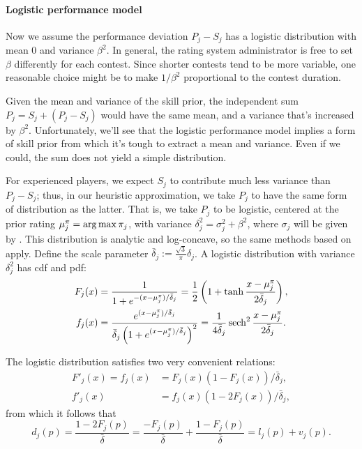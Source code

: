 \paragraph{Logistic performance model}
Now we assume the performance deviation $P_j-S_j$ has a logistic distribution with mean 0 and variance $\beta^2$. In general, the rating system administrator is free to set $\beta$ differently for each contest. Since shorter contests tend to be more variable, one reasonable choice might be to make $1/\beta^2$ proportional to the contest duration.

Given the mean and variance of the skill prior, the independent sum $P_j = S_j + (P_j-S_j)$ would have the same mean, and a variance that's increased by $\beta^2$. Unfortunately, we'll see that the logistic performance model implies a form of skill prior from which it's tough to extract a mean and variance. Even if we could, the sum does not yield a simple distribution.

For experienced players, we expect $S_j$ to contribute much less variance than $P_j-S_j$; thus, in our heuristic approximation, we take $P_j$ to have the same form of distribution as the latter. That is, we take $P_j$ to be logistic, centered at the prior rating $\mu^\pi_j = \operatorname*{arg\,max} \pi_j$, with variance $\delta_j^2 = \sigma_j^2 + \beta^2$, where $\sigma_j$ will be given by . This distribution is analytic and log-concave, so the same methods based on  apply. 
Define the scale parameter $\bar\delta_j := \frac{\sqrt{3}}{\pi} \delta_j$. A logistic distribution with variance $\delta_j^2$ has cdf and pdf:
\begin{align*}
F_j(x) &= \frac { 1 } { 1 + e^{-(x-\mu^\pi_j)/\bar\delta_j} }
= \frac 12 \left(1 + \tanh\frac{x-\mu^\pi_j}{2\bar\delta_j} \right),
\\f_j(x) &= \frac { e^{(x-\mu^\pi_j)/\bar\delta_j} } { \bar\delta_j\left( 1 + e^{(x-\mu^\pi_j)/\bar\delta_j} \right)^2}
= \frac { 1 } { 4\bar\delta_j} \operatorname{sech}^2\frac{x-\mu^\pi_j}{2\bar\delta_j}.
\end{align*}

The logistic distribution satisfies two very convenient relations:
\begin{align*}
F'_j(x) = f_j(x) &= F_j(x) (1 - F_j(x)) / \bar\delta_j,
\\f'_j(x) &= f_j(x) (1 - 2F_j(x)) / \bar\delta_j,
\end{align*}
from which it follows that
\[d_j(p)
= \frac{1 - 2F_j(p)}{\bar\delta}
= \frac{-F_j(p)}{\bar\delta} + \frac{1 - F_j(p)}{\bar\delta}
= l_j(p) + v_j(p).\]

